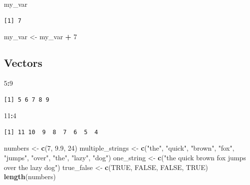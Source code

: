 \documentclass[]{book}
\newenvironment{Shaded}{\begin{snugshade}}{\end{snugshade}}
\newcommand{\KeywordTok}[1]{\textcolor[rgb]{0.13,0.29,0.53}{\textbf{#1}}}
\newcommand{\DecValTok}[1]{\textcolor[rgb]{0.00,0.00,0.81}{#1}}
\newcommand{\FloatTok}[1]{\textcolor[rgb]{0.00,0.00,0.81}{#1}}
\newcommand{\StringTok}[1]{\textcolor[rgb]{0.31,0.60,0.02}{#1}}
\newcommand{\OtherTok}[1]{\textcolor[rgb]{0.56,0.35,0.01}{#1}}
\newcommand{\OperatorTok}[1]{\textcolor[rgb]{0.81,0.36,0.00}{\textbf{#1}}}
\newcommand{\NormalTok}[1]{#1}
\theoremstyle{definition}
\theoremstyle{definition}
\theoremstyle{definition}
\theoremstyle{remark}
\begin{document}
\begin{Shaded}
\begin{Highlighting}[]
\NormalTok{my_var}
\end{Highlighting}
\end{Shaded}

\begin{verbatim}
[1] 7
\end{verbatim}

\begin{Shaded}
\begin{Highlighting}[]
\NormalTok{my_var <-}\StringTok{ }\NormalTok{my_var }\OperatorTok{+}\StringTok{ }\DecValTok{7}
\end{Highlighting}
\end{Shaded}

\subsection{Vectors}\label{vectors}

\begin{Shaded}
\begin{Highlighting}[]
\DecValTok{5}\OperatorTok{:}\DecValTok{9}
\end{Highlighting}
\end{Shaded}

\begin{verbatim}
[1] 5 6 7 8 9
\end{verbatim}

\begin{Shaded}
\begin{Highlighting}[]
\DecValTok{11}\OperatorTok{:}\DecValTok{4}
\end{Highlighting}
\end{Shaded}

\begin{verbatim}
[1] 11 10  9  8  7  6  5  4
\end{verbatim}

\begin{Shaded}
\begin{Highlighting}[]
\NormalTok{numbers <-}\StringTok{ }\KeywordTok{c}\NormalTok{(}\DecValTok{7}\NormalTok{, }\FloatTok{9.9}\NormalTok{, }\DecValTok{24}\NormalTok{)}
\NormalTok{multiple_strings <-}\StringTok{ }\KeywordTok{c}\NormalTok{(}\StringTok{"the"}\NormalTok{, }\StringTok{"quick"}\NormalTok{, }\StringTok{"brown"}\NormalTok{, }\StringTok{"fox"}\NormalTok{, }\StringTok{"jumps"}\NormalTok{, }\StringTok{"over"}\NormalTok{, }\StringTok{"the"}\NormalTok{, }\StringTok{"lazy"}\NormalTok{, }\StringTok{"dog"}\NormalTok{)}
\NormalTok{one_string <-}\StringTok{ }\KeywordTok{c}\NormalTok{(}\StringTok{"the quick brown fox jumps over the lazy dog"}\NormalTok{)}
\NormalTok{true_false <-}\StringTok{ }\KeywordTok{c}\NormalTok{(}\OtherTok{TRUE}\NormalTok{, }\OtherTok{FALSE}\NormalTok{, }\OtherTok{FALSE}\NormalTok{, }\OtherTok{TRUE}\NormalTok{)}
\KeywordTok{length}\NormalTok{(numbers)}
\end{Highlighting}
\end{Shaded}
\end{document}
